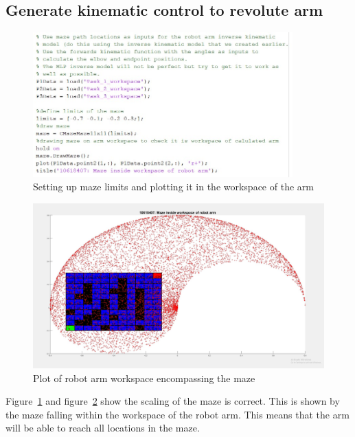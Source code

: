 \documentclass [11pt]{article}
\begin{document}
\subsection{Generate kinematic control to revolute arm}

\begin{figure}[H]
\centerline{\includegraphics[width=10cm]{maze_inside_robot_workspace_code}}
\caption{Setting up maze limits and plotting it in the workspace of the arm}
\label{fig:maze_inside_workspace}
\end{figure}

\begin{figure}[H]
\centerline{\includegraphics[width=15cm]{maze_inside_robot_workspace}}
\caption{Plot of robot arm workspace encompassing the maze}
\label{fig:maze_inside_workspace_plot}
\end{figure}

Figure~\ref{fig:maze_inside_workspace} and figure~\ref{fig:maze_inside_workspace_plot} show the scaling of the maze is correct. This is shown by the maze falling within the workspace of the robot arm. This means that the arm will be able to reach all locations in the maze.
\end{document}

